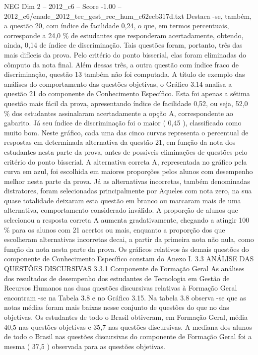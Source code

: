 \begin{textsample}{NEG Dim 2 – 2012\_c6 – Score -1.00 – 2012\_c6/enade\_2012\_tec\_gest\_rec\_hum\_c62ecb317d.txt}
Destaca -se, também, a questão 20, com índice de facilidade 0,24, o que, em termos percentuais, corresponde a 24,0 \% de estudantes que responderam acertadamente, obtendo, ainda, 0,14 de índice de discriminação.
Tais questões foram, portanto, três das mais difíceis da prova.
Pelo critério do ponto bisserial, elas foram eliminadas do cômputo da nota final.
Além dessas três, a outra questão com índice fraco de discriminação, questão 13 também não foi computada.
A título de exemplo das análises do comportamento das questões objetivas, o Gráfico 3.14 analisa a questão 21 do componente de Conhecimento Específico.
Esta foi apenas a sétima questão mais fácil da prova, apresentando índice de facilidade 0,52, ou seja, 52,0 \% dos estudantes assinalaram acertadamente a opção A, correspondente ao gabarito.
Já seu índice de discriminação foi o maior ( 0,45 ), classificado como muito bom.
Neste gráfico, cada uma das cinco curvas representa o percentual de respostas em determinada alternativa da questão 21, em função da nota dos estudantes nesta parte da prova, antes de possíveis eliminações de questões pelo critério do ponto bisserial.
A alternativa correta A, representada no gráfico pela curva em azul, foi escolhida em maiores proporções pelos alunos com desempenho melhor nesta parte da prova.
Já as alternativas incorretas, também denominadas distratores, foram selecionadas principalmente por Aqueles com nota zero, na sua quase totalidade deixaram esta questão em branco ou marcaram mais de uma alternativa, comportamento considerado inválido.
A proporção de alunos que selecionou a resposta correta A aumenta gradativamente, chegando a atingir 100 \% para os alunos com 21 acertos ou mais, enquanto a proporção dos que escolheram alternativas incorretas decai, a partir da primeira nota não nula, como função da nota nesta parte da prova.
Os gráficos relativos às demais questões do componente de Conhecimento Específico constam do Anexo I. 3.3 ANÁLISE DAS QUESTÕES DISCURSIVAS 3.3.1 Componente de Formação Geral As análises dos resultados de desempenho dos estudantes de Tecnologia em Gestão de Recursos Humanos nas duas questões discursivas relativas à Formação Geral encontram -se na Tabela 3.8 e no Gráfico 3.15.
Na tabela 3.8 observa -se que as notas médias foram mais baixas nesse conjunto de questões do que no das objetivas.
Os estudantes de todo o Brasil obtiveram, em Formação Geral, média 40,5 nas questões objetivas e 35,7 nas questões discursivas.
A mediana dos alunos de todo o Brasil nas questões discursivas do componente de Formação Geral foi a mesma ( 37,5 ) observada para as questões objetivas.

\end{textsample}

